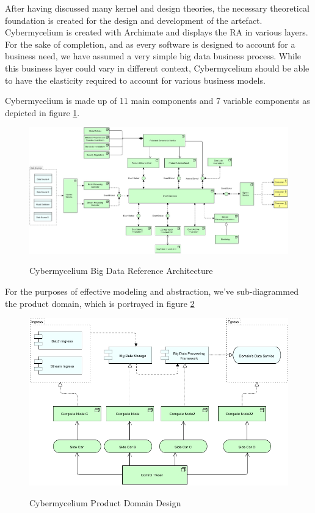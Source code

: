 \documentclass[review]{elsarticle}
\begin{document}
After having discussed many kernel and design theories, the necessary theoretical foundation is created for the design and development of the artefact. Cybermycelium is created with Archimate and displays the RA in various layers. For the sake of completion, and as every software is designed to account for a business need, we have assumed a very simple big data business process. While this business layer could vary in different context, Cybermycelium should be able to have the elasticity required to account for various business models. 

Cybermycelium is made up of 11 main components and 7 variable components as depicted in figure \ref{fig:Cybermycelium}.

\begin{figure}[h!]
    \centering
    \includegraphics[width=12cm]{Media/Cybermycelium.jpg}
    \label{fig:Cybermycelium}
    \caption{Cybermycelium Big Data Reference Architecture}
\end{figure}

For the purposes of effective modeling and abstraction, we've sub-diagrammed the product domain, which is portrayed in figure \ref{fig:Cybermycelium Product Domain Design}

\begin{figure}[h!]
    \centering
    \includegraphics[width=12cm]{Media/Product Domain.jpg}
    \label{fig:Cybermycelium Product Domain Design}
    \caption{Cybermycelium Product Domain Design}
\end{figure}
\end{document}
